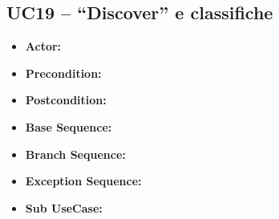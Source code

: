 \subsection{\textbf{UC19 -- ``Discover'' e classifiche}}
\begin{itemize}
    \item \textbf{Actor:}
    \item \textbf{Precondition:}
    \item \textbf{Postcondition:}
    \item \textbf{Base Sequence:}
    \item \textbf{Branch Sequence:}
    \item \textbf{Exception Sequence:}
    \item \textbf{Sub UseCase:}
\end{itemize}